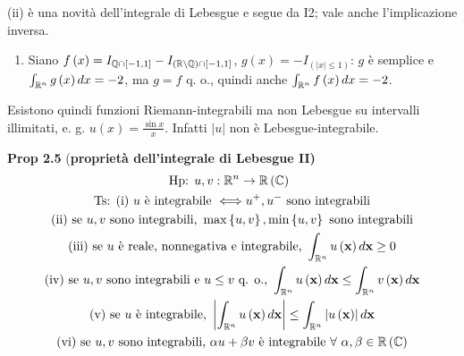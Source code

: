 \documentclass{article}
\begin{document}
(ii) \`{e} una novit\`{a} dell'integrale di Lebesgue e segue da I2; vale
anche l'implicazione inversa.

\begin{enumerate}
\item Siano $f\left( x\right) =I_{%
\mathbb{Q}
\cap \left[ -1,1\right] }-I_{\left( 
\mathbb{R}
\backslash 
\mathbb{Q}
\right) \cap \left[ -1,1\right] }$, $g\left( x\right) =-I_{\left( \left\vert
x\right\vert \leq 1\right) }$: $g$ \`{e} semplice e $\int_{%
\mathbb{R}
^{n}}g\left( x\right) dx=-2$, ma $g=f$ q. o., quindi anche $\int_{%
\mathbb{R}
^{n}}f\left( x\right) dx=-2$.
\end{enumerate}

Esistono quindi funzioni Riemann-integrabili ma non Lebesgue su intervalli
illimitati, e. g. $u\left( x\right) =\frac{\sin x}{x}$. Infatti $\left\vert
u\right\vert $ non \`{e} Lebesgue-integrabile.

\textbf{Prop 2.5} (\textbf{propriet\`{a} dell'integrale di Lebesgue II)}%
\begin{gather*}
\text{Hp: }u,v:%
\mathbb{R}
^{n}\rightarrow 
\mathbb{R}
\left( 
\mathbb{C}
\right) \text{ } \\
\text{Ts: (i) }u\text{ \`{e} integrabile }\Longleftrightarrow u^{+},u^{-}%
\text{ sono integrabili} \\
\text{(ii) se }u,v\text{ sono integrabili, }\max \left\{ u,v\right\} ,\min
\left\{ u,v\right\} \text{ sono integrabili} \\
\text{(iii) se }u\text{ \`{e} reale, nonnegativa e integrabile, }\int_{%
\mathbb{R}
^{n}}u\left( \mathbf{x}\right) d\mathbf{x}\geq 0 \\
\text{(iv) se }u,v\text{ sono integrabili e }u\leq v\text{ q. o., }\int_{%
\mathbb{R}
^{n}}u\left( \mathbf{x}\right) d\mathbf{x}\leq \int_{%
\mathbb{R}
^{n}}v\left( \mathbf{x}\right) d\mathbf{x} \\
\text{(v) se }u\text{ \`{e} integrabile, }\left\vert \int_{%
\mathbb{R}
^{n}}u\left( \mathbf{x}\right) d\mathbf{x}\right\vert \leq \int_{%
\mathbb{R}
^{n}}\left\vert u\left( \mathbf{x}\right) \right\vert d\mathbf{x} \\
\text{(vi) se }u,v\text{ sono integrabili, }\alpha u+\beta v\text{ \`{e}
integrabile }\forall \text{ }\alpha ,\beta \in 
\mathbb{R}
\left( 
\mathbb{C}
\right)
\end{gather*}
\end{document}
